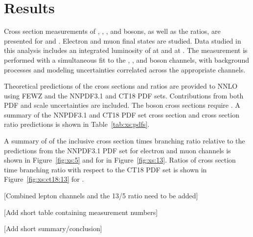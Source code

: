 \chapter{Results}\label{ch:results}
Cross section measurements of \Wp, \Wm, \W, and \Z bosons, as well as the ratios, are presented for \serag and \serah. Electron and muon final states are studied. Data studied in this analysis includes an integrated luminosity of \lumig at \serag and \lumih at \serah. The measurement is performed with a simultaneous fit to the \Wp, \Wm, and \Z boson channels, with background processes and modeling uncertainties correlated across the appropriate channels. 

Theoretical predictions of the cross sections and ratios are provided to NNLO using FEWZ and the NNPDF3.1 and CT18 PDF sets. Contributions from both PDF and scale uncertainties are included. The \Z boson cross sections require \masswindow. A summary of the NNPDF3.1 and CT18 PDF set cross section and cross section ratio predictions is shown in Table~\ref{tab:xs:pdfs}.



A summary of of the inclusive cross section times branching ratio relative to the predictions from the NNPDF3.1 PDF set for \serag electron and muon channels is shown in Figure~\ref{fig:xs:5} and for \serah in Figure~\ref{fig:xs:13}. Ratios of cross section time branching ratio with respect to the CT18 PDF set is shown in Figure~\ref{fig:xs:ct18:13} for \serah.



[Combined lepton channels and the 13/5 ratio need to be added]

[Add short table containing measurement numbers]


[Add short summary/conclusion]
%

% 
% 






